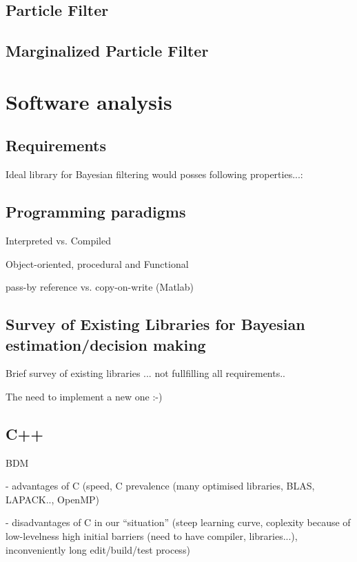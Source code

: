 \documentclass[a4paper,12pt,oneside]{report}
\begin{document}
\section{Particle Filter}

\section{Marginalized Particle Filter}


\chapter{Software analysis}

\section{Requirements}

Ideal library for Bayesian filtering would posses following properties...:

\section{Programming paradigms}

Interpreted vs. Compiled

Object-oriented, procedural and Functional

pass-by reference vs. copy-on-write (Matlab)

\section{Survey of Existing Libraries for Bayesian estimation/decision making}

Brief survey of existing libraries ... not fullfilling all requirements..

The need to implement a new one :-)

\section{C++}

BDM

 - advantages of C (speed, C prevalence (many optimised libraries, BLAS, LAPACK.., OpenMP)

 - disadvantages of C in our ``situation'' (steep learning curve, coplexity because of low-levelness
   high initial barriers (need to have compiler, libraries...), inconveniently long edit/build/test
   process)
\end{document}
